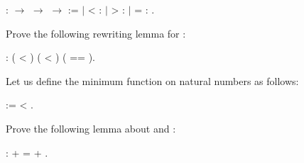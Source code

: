 \begin{coqdoccode}
\coqdocemptyline
\coqdocnoindent
{}    :  \ensuremath{\rightarrow}  \ensuremath{\rightarrow}  \ensuremath{\rightarrow}  :=\coqdoceol
\coqdocindent{1.00em}
\ensuremath{|}    <  :      \coqdoceol
\coqdocindent{1.00em}
\ensuremath{|}    >  :      \coqdoceol
\coqdocindent{1.00em}
\ensuremath{|}    =  :      .\coqdoceol
\coqdocemptyline
\end{coqdoccode}


\begin{exercise}


Prove the following rewriting lemma for :


\begin{coqdoccode}
\coqdocemptyline
\coqdocnoindent
{}    :    ( < ) ( < ) ( == ).\coqdoceol
\coqdocemptyline
\coqdocemptyline
\end{coqdoccode}


\end{exercise}


\begin{exercise}


Let us define the minimum function  on natural numbers as
follows:


\begin{coqdoccode}
\coqdocemptyline
\coqdocnoindent
{}    :=   <     .\coqdoceol
\coqdocemptyline
\end{coqdoccode}
Prove the following lemma about  and :
\begin{coqdoccode}
\coqdocemptyline
\coqdocnoindent
{}    :    +    =  + .\coqdoceol
\coqdocemptyline
\end{coqdoccode}


\end{exercise}


\begin{coqdoccode}
\coqdocemptyline
\coqdocemptyline
\coqdocemptyline
\end{coqdoccode}
